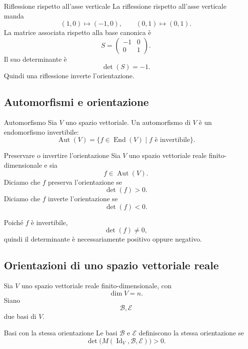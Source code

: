 \documentclass[a4paper]{article}
\begin{document}
\begin{snippetexample}{Riflessione rispetto all'asse verticale}
    La riflessione rispetto all'asse verticale manda
    \[
        (1,0)\mapsto(-1,0),
        \qquad
        (0,1)\mapsto(0,1).
    \]
    La matrice associata rispetto alla base canonica è
    \[
        S=
        \begin{pmatrix}
            -1 & 0\\
            0 & 1
        \end{pmatrix}.
    \]
    Il suo determinante è
    \[
        \det(S)=-1.
    \]
    Quindi una riflessione inverte l'orientazione.
\end{snippetexample}

\subsection{Automorfismi e orientazione}

\begin{snippetdefinition}{Automorfismo}
    Sia \(V\) uno spazio vettoriale. Un automorfismo di \(V\) è un endomorfismo invertibile:
    \[
        \operatorname{Aut}(V)
        =
        \{f\in\operatorname{End}(V)\mid f \text{ è invertibile}\}.
    \]
\end{snippetdefinition}

\begin{snippetdefinition}{Preservare o invertire l'orientazione}
    Sia \(V\) uno spazio vettoriale reale finito-dimensionale e sia
    \[
        f\in\operatorname{Aut}(V).
    \]
    Diciamo che \(f\) preserva l'orientazione se
    \[
        \det(f)>0.
    \]
    Diciamo che \(f\) inverte l'orientazione se
    \[
        \det(f)<0.
    \]
\end{snippetdefinition}

Poiché \(f\) è invertibile,
\[
    \det(f)\neq 0,
\]
quindi il determinante è necessariamente positivo oppure negativo.

\subsection{Orientazioni di uno spazio vettoriale reale}

Sia \(V\) uno spazio vettoriale reale finito-dimensionale, con
\[
    \dim V=n.
\]
Siano
\[
    \mathcal{B},\mathcal{E}
\]
due basi di \(V\).

\begin{snippetdefinition}{Basi con la stessa orientazione}
    Le basi \(\mathcal{B}\) e \(\mathcal{E}\) definiscono la stessa orientazione se
    \[
        \det\bigl(M(\operatorname{Id}_V,\mathcal{B},\mathcal{E})\bigr)>0.
    \]
\end{snippetdefinition}
\end{document}
